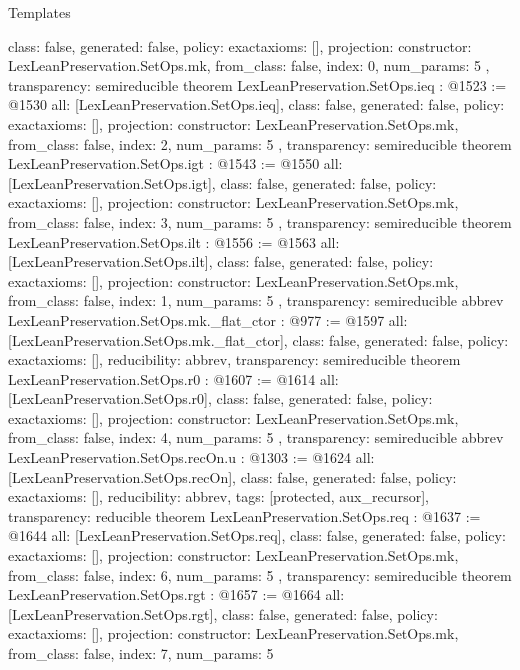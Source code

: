\begin{lexlean}{Templates}
\begin{coremodule}
{  class: false,
  generated: false,
  policy: exact{axioms: []},
  projection: {
    constructor: LexLeanPreservation.SetOps.mk,
    from_class: false,
    index: 0,
    num_params: 5
  },
  transparency: semireducible
}
theorem LexLeanPreservation.SetOps.ieq : @1523 := @1530 {
  all: [LexLeanPreservation.SetOps.ieq],
  class: false,
  generated: false,
  policy: exact{axioms: []},
  projection: {
    constructor: LexLeanPreservation.SetOps.mk,
    from_class: false,
    index: 2,
    num_params: 5
  },
  transparency: semireducible
}
theorem LexLeanPreservation.SetOps.igt : @1543 := @1550 {
  all: [LexLeanPreservation.SetOps.igt],
  class: false,
  generated: false,
  policy: exact{axioms: []},
  projection: {
    constructor: LexLeanPreservation.SetOps.mk,
    from_class: false,
    index: 3,
    num_params: 5
  },
  transparency: semireducible
}
theorem LexLeanPreservation.SetOps.ilt : @1556 := @1563 {
  all: [LexLeanPreservation.SetOps.ilt],
  class: false,
  generated: false,
  policy: exact{axioms: []},
  projection: {
    constructor: LexLeanPreservation.SetOps.mk,
    from_class: false,
    index: 1,
    num_params: 5
  },
  transparency: semireducible
}
abbrev LexLeanPreservation.SetOps.mk._flat_ctor : @977 := @1597 {
  all: [LexLeanPreservation.SetOps.mk._flat_ctor],
  class: false,
  generated: false,
  policy: exact{axioms: []},
  reducibility: abbrev{},
  transparency: semireducible
}
theorem LexLeanPreservation.SetOps.r0 : @1607 := @1614 {
  all: [LexLeanPreservation.SetOps.r0],
  class: false,
  generated: false,
  policy: exact{axioms: []},
  projection: {
    constructor: LexLeanPreservation.SetOps.mk,
    from_class: false,
    index: 4,
    num_params: 5
  },
  transparency: semireducible
}
abbrev LexLeanPreservation.SetOps.recOn.{u} : @1303 := @1624 {
  all: [LexLeanPreservation.SetOps.recOn],
  class: false,
  generated: false,
  policy: exact{axioms: []},
  reducibility: abbrev{},
  tags: [protected, aux_recursor],
  transparency: reducible
}
theorem LexLeanPreservation.SetOps.req : @1637 := @1644 {
  all: [LexLeanPreservation.SetOps.req],
  class: false,
  generated: false,
  policy: exact{axioms: []},
  projection: {
    constructor: LexLeanPreservation.SetOps.mk,
    from_class: false,
    index: 6,
    num_params: 5
  },
  transparency: semireducible
}
theorem LexLeanPreservation.SetOps.rgt : @1657 := @1664 {
  all: [LexLeanPreservation.SetOps.rgt],
  class: false,
  generated: false,
  policy: exact{axioms: []},
  projection: {
    constructor: LexLeanPreservation.SetOps.mk,
    from_class: false,
    index: 7,
    num_params: 5
}}
\end{coremodule}
\end{lexlean}
